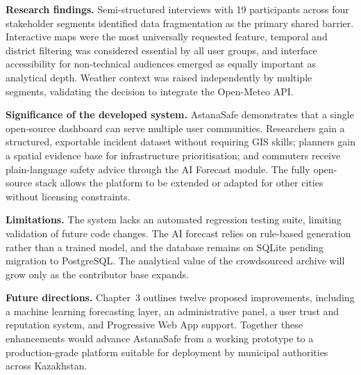 \documentclass[12pt,a4paper]{report}
\begin{document}
\textbf{Research findings.} Semi-structured interviews with 19 participants across four stakeholder segments identified data fragmentation as the primary shared barrier. Interactive maps were the most universally requested feature, temporal and district filtering was considered essential by all user groups, and interface accessibility for non-technical audiences emerged as equally important as analytical depth. Weather context was raised independently by multiple segments, validating the decision to integrate the Open-Meteo API.

\textbf{Significance of the developed system.} AstanaSafe demonstrates that a single open-source dashboard can serve multiple user communities. Researchers gain a structured, exportable incident dataset without requiring GIS skills; planners gain a spatial evidence base for infrastructure prioritisation; and commuters receive plain-language safety advice through the AI Forecast module. The fully open-source stack allows the platform to be extended or adapted for other cities without licensing constraints.

\textbf{Limitations.} The system lacks an automated regression testing suite, limiting validation of future code changes. The AI forecast relies on rule-based generation rather than a trained model, and the database remains on SQLite pending migration to PostgreSQL. The analytical value of the crowdsourced archive will grow only as the contributor base expands.

\textbf{Future directions.} Chapter~3 outlines twelve proposed improvements, including a machine learning forecasting layer, an administrative panel, a user trust and reputation system, and Progressive Web App support. Together these enhancements would advance AstanaSafe from a working prototype to a production-grade platform suitable for deployment by municipal authorities across Kazakhstan.

\clearpage

\end{document}
